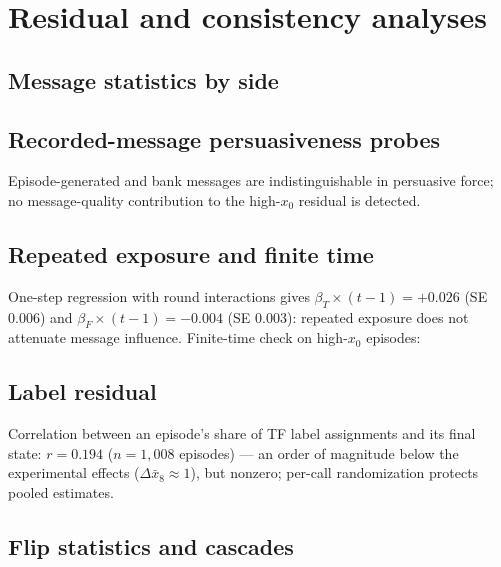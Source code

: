 \documentclass[11pt]{article}
\begin{document}
\section{Residual and consistency analyses}

\subsection{Message statistics by side}
\begin{center}

\end{center}

\subsection{Recorded-message persuasiveness probes}
\begin{center}

\end{center}
Episode-generated and bank messages are indistinguishable in persuasive
force; no message-quality contribution to the high-$x_0$ residual is detected.

\subsection{Repeated exposure and finite time}

One-step regression with round interactions gives
$\beta_T \times (t-1) = +0.026$ (SE 0.006) and $\beta_F \times (t-1) =
-0.004$ (SE 0.003): repeated exposure does not attenuate message influence.
Finite-time check on high-$x_0$ episodes:
\begin{center}
\small

\end{center}

\subsection{Label residual}

Correlation between an episode's share of TF label assignments and its final
state: $r = 0.194$ ($n = 1{,}008$ episodes) --- an order of magnitude below
the experimental effects ($\Delta \bar x_8 \approx 1$), but nonzero;
per-call randomization protects pooled estimates.

\subsection{Flip statistics and cascades}
\end{document}
